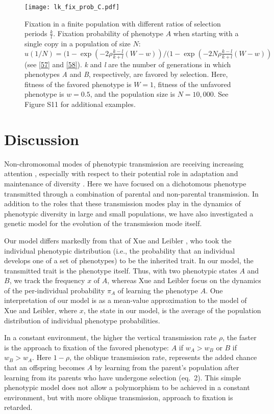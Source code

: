 \documentclass[9pt,twocolumn,twoside,lineno]{pnas-new}
\begin{document}
\begin{figure}[h]
\centering
\texttt{[image: lk\_fix\_prob\_C.pdf]}
\caption{Fixation in a finite population with different ratios of selection periods \(\frac{k}{l}\). Fixation probability of phenotype $A$ when starting with a single copy in a population of size $N$: $u(1/N) = (1-\exp(-2 \rho \frac{k-l}{k+l}(W-w))/(1-\exp(-2 N \rho \frac{k-l}{k+l}(W-w))$ (see \eqref{57} and \eqref{58}).
\emph{k} and \emph{l} are the number of
generations in which phenotypes \emph{A} and \emph{B}, respectively, are favored by
selection. Here, fitness of the favored phenotype is $W = 1$, fitness of the unfavored phenotype is $w=0.5$, and the population size is \(N=10,000\). 
See Figure S11 for additional examples.} \label{lk_fix_prob_C}
\end{figure}

 
 \section*{Discussion}

Non-chromosomal modes of phenotypic transmission are receiving increasing attention \cite{whiten2017extension,jaenisch2003epigenetic,allis2016molecular}, especially with respect to their potential role in adaptation and maintenance of diversity \cite{rivoire2014model}. Here we have focused on a dichotomous phenotype transmitted through a combination of parental and non-parental transmission. In addition to the roles that these transmission modes play in the dynamics of phenotypic diversity in large and small populations, we have also investigated a genetic model for the evolution of the transmission mode itself.

Our model differs markedly from that of Xue and Leibler \cite{xue2016evolutionary}, who took the individual phenotypic distribution (i.e., the probability that an individual develops one of a set of phenotypes) to be the inherited trait. In our model, the transmitted trait is the phenotype itself. Thus, with two phenotypic states $A$ and $B$, we track the frequency $x$ of $A$, whereas Xue and Leibler focus on the dynamics of the per-individual probability $\pi_A$ of learning the phenotype $A$. One interpretation of our model is as a mean-value approximation to the model of Xue and Leibler, where $x$, the state in our model, is the average of the population distribution of individual phenotype probabilities. 

In a constant environment, the higher the vertical transmission rate $\rho$, the faster is the approach to fixation of the favored phenotype: $A$ if $w_A>w_B$ or $B$ if $w_B>w_A$. Here $1-\rho$, the oblique transmission rate, represents the added chance that an offspring becomes $A$ by learning from the parent's population after learning from its parents who have undergone selection (eq.\ 2). This simple phenotypic model does not allow a polymorphism to be achieved in a constant environment, but with more oblique transmission, approach to fixation is retarded.
\end{document}
